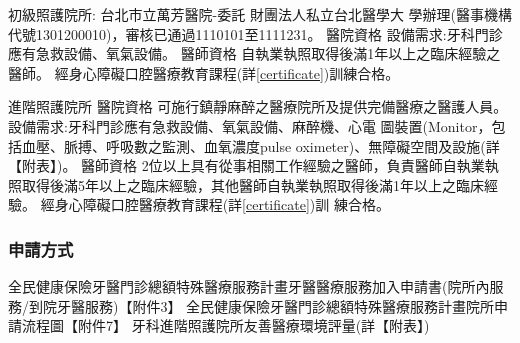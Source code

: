 \begin{outline}

\1 初級照護院所:
台北市立萬芳醫院-委託
財團法人私立台北醫學大
學辦理(醫事機構代號1301200010)，審核已通過1110101至1111231。
\2 醫院資格
    \3 設備需求:牙科門診應有急救設備、氧氣設備。
\2 醫師資格
    \3 %
    自執業執照取得後滿1年以上之臨床經驗之醫師。
    \3 經身心障礙口腔醫療教育課程(詳\ref{certificate})訓練合格。

\1 進階照護院所 %
\2 醫院資格
    \3 可施行鎮靜麻醉之醫療院所及提供完備醫療之醫護人員。
    \3 設備需求:牙科門診應有急救設備、氧氣設備、麻醉機、心電 圖裝置(Monitor，包括血壓、脈搏、呼吸數之監測、血氧濃度pulse oximeter)、無障礙空間及設施(詳【附表】)。
\2 醫師資格
    \3 2位以上具有從事相關工作經驗之醫師，負責醫師自執業執照取得後滿5年以上之臨床經驗，其他醫師自執業執照取得後滿1年以上之臨床經驗。
    \3 經身心障礙口腔醫療教育課程(詳\ref{certificate})訓 練合格。
\end{outline}

\subsubsection{申請方式}
\begin{outline}

\1 全民健康保險牙醫門診總額特殊醫療服務計畫牙醫醫療服務加入申請書(院所內服務/到院牙醫服務)【附件3】
\1 全民健康保險牙醫門診總額特殊醫療服務計畫院所申請流程圖【附件7】
\1 牙科進階照護院所友善醫療環境評量(詳【附表】)

\end{outline}


